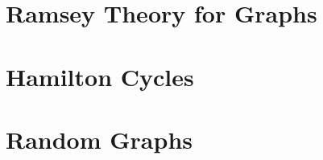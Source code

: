 \documentclass{jarticle}
\begin{document}
\newpage

\section{Ramsey Theory for Graphs}























\newpage

\section{Hamilton Cycles}

















\newpage

\section{Random Graphs}





















\newpage
\end{document}
